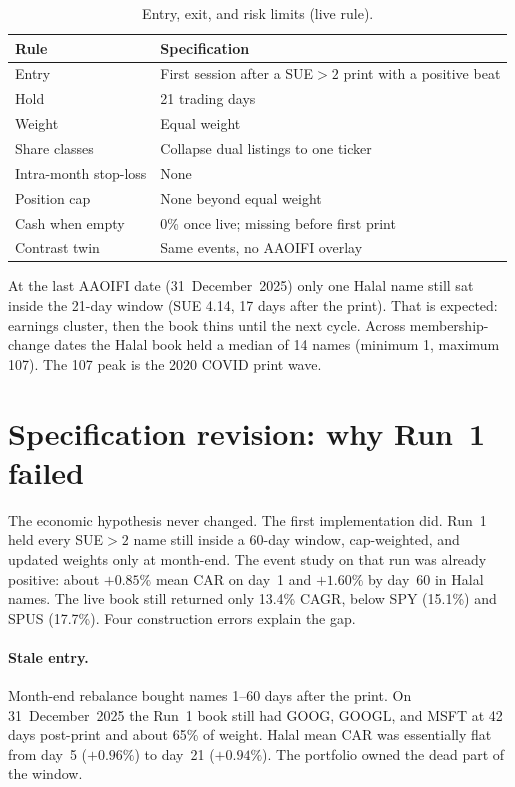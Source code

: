 \documentclass[11pt,letterpaper]{article}
\begin{document}
\begin{table}[htbp]
\centering
\caption{Entry, exit, and risk limits (live rule).}
\label{tab:rules}
\small
\begin{tabular}{lp{}}
\toprule
Rule & Specification \\
\midrule
Entry & First session after a SUE$>2$ print with a positive beat \\
Hold & 21 trading days \\
Weight & Equal weight \\
Share classes & Collapse dual listings to one ticker \\
Intra-month stop-loss & None \\
Position cap & None beyond equal weight \\
Cash when empty & 0\% once live; missing before first print \\
Contrast twin & Same events, no AAOIFI overlay \\
\bottomrule
\end{tabular}
\end{table}

At the last AAOIFI date (31~December~2025) only one Halal name still sat inside the 21-day window (SUE 4.14, 17 days after the print). That is expected: earnings cluster, then the book thins until the next cycle. Across membership-change dates the Halal book held a median of 14 names (minimum 1, maximum 107). The 107 peak is the 2020 COVID print wave.

\section{Specification revision: why Run~1 failed}
\label{sec:revision}

The economic hypothesis never changed. The first implementation did. Run~1 held every SUE$>2$ name still inside a 60-day window, cap-weighted, and updated weights only at month-end. The event study on that run was already positive: about $+0.85\%$ mean CAR on day~1 and $+1.60\%$ by day~60 in Halal names. The live book still returned only 13.4\% CAGR, below SPY (15.1\%) and SPUS (17.7\%). Four construction errors explain the gap.

\paragraph{Stale entry.}
Month-end rebalance bought names 1--60 days after the print. On 31~December~2025 the Run~1 book still had GOOG, GOOGL, and MSFT at 42 days post-print and about 65\% of weight. Halal mean CAR was essentially flat from day~5 ($+0.96\%$) to day~21 ($+0.94\%$). The portfolio owned the dead part of the window.
\end{document}
